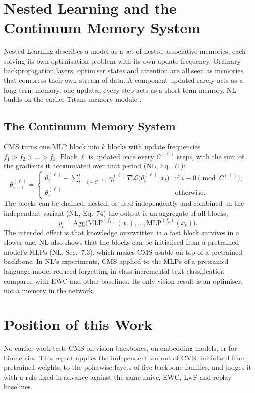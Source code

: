 \documentclass[12pt,a4paper]{report}
\begin{document}
\section{Nested Learning and the Continuum Memory System}
Nested Learning \cite{behrouz2025nested} describes a model as a set of nested associative memories, each solving its own optimisation problem with its own update frequency. Ordinary backpropagation layers, optimiser states and attention are all seen as memories that compress their own stream of data. A component updated rarely acts as a long-term memory; one updated every step acts as a short-term memory. NL builds on the earlier Titans memory module \cite{behrouz2025titans}.

\subsection{The Continuum Memory System}
CMS turns one MLP block into $k$ blocks with update frequencies $f_1 > f_2 > \dots > f_k$. Block $\ell$ is updated once every $C^{(\ell)}$ steps, with the sum of the gradients it accumulated over that period (NL, Eq.~71):
\begin{equation}
\theta^{(\ell)}_{i+1} =
\begin{cases}
\theta^{(\ell)}_{i} - \sum_{t=i-C^{(\ell)}}^{i} \eta^{(\ell)}_t \, \nabla \mathcal{L}\big(\theta^{(\ell)}_t; x_t\big) & \text{if } i \equiv 0 \pmod{C^{(\ell)}},\\[2pt]
\theta^{(\ell)}_{i} & \text{otherwise.}
\end{cases}
\label{eq:cms}
\end{equation}
The blocks can be chained, nested, or used independently and combined; in the independent variant (NL, Eq.~74) the output is an aggregate of all blocks,
\begin{equation}
y_t = \mathrm{Agg}\big(\mathrm{MLP}^{(f_1)}(x_t), \dots, \mathrm{MLP}^{(f_k)}(x_t)\big).
\end{equation}
The intended effect is that knowledge overwritten in a fast block survives in a slower one. NL also shows that the blocks can be initialised from a pretrained model's MLPs (NL, Sec.~7.3), which makes CMS usable on top of a pretrained backbone. In NL's experiments, CMS applied to the MLPs of a pretrained language model reduced forgetting in class-incremental text classification compared with EWC and other baselines. Its only vision result is an optimiser, not a memory in the network.

\section{Position of this Work}
No earlier work tests CMS on vision backbones, on embedding models, or for biometrics. This report applies the independent variant of CMS, initialised from pretrained weights, to the pointwise layers of five backbone families, and judges it with a rule fixed in advance against the same naive, EWC, LwF and replay baselines.
\end{document}
